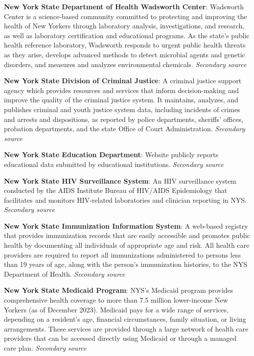 \documentclass[
  english,
  letterpaper,
]{report}
\begin{document}
\textbf{New York State Department of Health Wadsworth Center}: Wadsworth
Center is a science-based community committed to protecting and
improving the health of New Yorkers through laboratory analysis,
investigations, and research, as well as laboratory certification and
educational programs. As the state's public health reference laboratory,
Wadsworth responds to urgent public health threats as they arise,
develops advanced methods to detect microbial agents and genetic
disorders, and measures and analyzes environmental chemicals.
\emph{Secondary source}

\textbf{New York State Division of Criminal Justice}: A criminal justice
support agency which provides resources and services that inform
decision-making and improve the quality of the criminal justice system.
It maintains, analyzes, and publishes criminal and youth justice system
data, including incidents of crimes and arrests and dispositions, as
reported by police departments, sheriffs' offices, probation
departments, and the state Office of Court Administration.
\emph{Secondary source}

\textbf{New York State Education Department}: Website publicly reports
educational data submitted by educational institutions. \emph{Secondary
source}

\textbf{New York State HIV Surveillance System}: An HIV surveillance
system conducted by the AIDS Institute Bureau of HIV/AIDS Epidemiology
that facilitates and monitors HIV-related laboratories and clinician
reporting in NYS. \emph{Secondary source}

\textbf{New York State Immunization Information System}: A web-based
registry that provides immunization records that are easily accessible
and promotes public health by documenting all individuals of appropriate
age and risk. All health care providers are required to report all
immunizations administered to persons less than 19 years of age, along
with the person's immunization histories, to the NYS Department of
Health. \emph{Secondary source}

\textbf{New York State Medicaid Program}: NYS's Medicaid program
provides comprehensive health coverage to more than 7.5 million
lower-income New Yorkers (as of December 2023). Medicaid pays for a wide
range of services, depending on a resident's age, financial
circumstances, family situation, or living arrangements. These services
are provided through a large network of health care providers that can
be accessed directly using Medicaid or through a managed care plan.
\emph{Secondary source}
\end{document}
